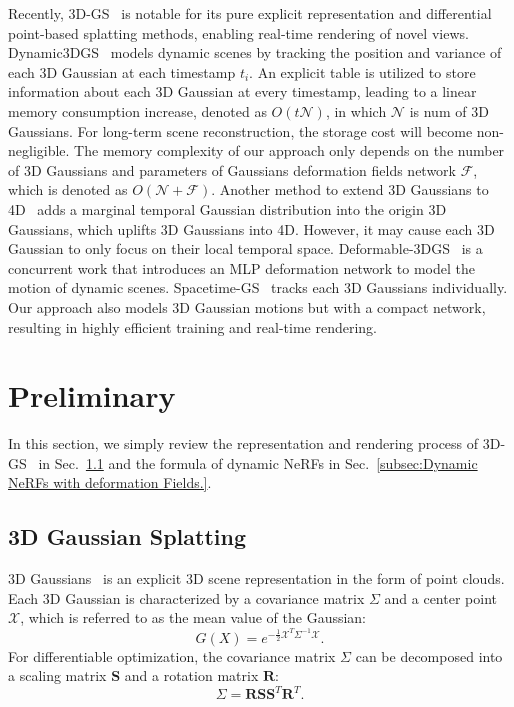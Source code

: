 \documentclass[10pt,twocolumn,letterpaper]{article}
\begin{document}
Recently, 3D-GS~\cite{3dgs,chen2024survey} is notable for its pure explicit representation and differential point-based splatting methods, enabling real-time rendering of novel views. Dynamic3DGS~\cite{dynamic3dgs} models dynamic scenes by tracking the position and variance of each 3D Gaussian at each timestamp $t_i$. An explicit table is utilized to store information about each 3D Gaussian at every timestamp, leading to a linear memory consumption increase, denoted as $O(t\mathcal{N})$, in which $\mathcal{N}$ is num of 3D Gaussians. For long-term scene reconstruction, the storage cost will become non-negligible. The memory complexity of our approach only depends on the number of 3D Gaussians and parameters of Gaussians deformation fields network $\mathcal{F}$, which is denoted as $O(\mathcal{N}+\mathcal{F})$. Another method to extend 3D Gaussians to 4D~\cite{4dgs-2} adds a marginal temporal Gaussian distribution into the origin 3D Gaussians, which uplifts 3D Gaussians into 4D. However, it may cause each 3D Gaussian to only focus on their local temporal space. Deformable-3DGS~\cite{yang2023deformable3dgs} is a concurrent work that introduces an MLP deformation network to model the motion of dynamic scenes. Spacetime-GS~\cite{li2023spacetime} tracks each 3D Gaussians individually. Our approach also models 3D Gaussian motions but with a compact network, resulting in highly efficient training and real-time rendering.  

\section{Preliminary}
In this section, we simply review the representation and rendering process of 3D-GS~\cite{3dgs} in Sec.~\ref{subsec:3D Gaussian Splatting} and the formula of dynamic NeRFs in Sec.~\ref{subsec:Dynamic NeRFs with deformation Fields.}.

\subsection{3D Gaussian Splatting}
\label{subsec:3D Gaussian Splatting}
3D Gaussians~\cite{3dgs} is an explicit 3D scene representation in the form of point clouds. Each 3D Gaussian is characterized by a covariance matrix $\Sigma$ and a center point $\mathcal{X}$, which is referred to as the mean value of the Gaussian:
\begin{equation}
\label{formula:gaussian's formula}
    G(X)=e^{-\frac{1}{2}\mathcal{X}^T\Sigma^{-1}\mathcal{X}}.
\end{equation}
For differentiable optimization, the covariance matrix $\Sigma$ can be decomposed into a scaling matrix $\mathbf{S}$ and a rotation matrix $\mathbf{R}$:
\begin{equation}
\label{formula:covariance decomposition}
    \Sigma = \mathbf{R}\mathbf{S}\mathbf{S}^T\mathbf{R}^T.
\end{equation}
\end{document}
